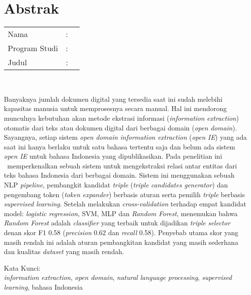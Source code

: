 %
%
%

\chapter*{Abstrak}

\vspace*{0.2cm}

\noindent \begin{tabular}{l l p{10cm}}
	Nama&: & \penulis \\
	Program Studi&: & \program \\
	Judul&: & \judul \\
\end{tabular} \\ 

\vspace*{0.5cm}

\noindent Banyaknya jumlah dokumen digital yang tersedia saat ini sudah melebihi kapasitas manusia untuk memprosesnya secara manual. Hal ini mendorong munculnya kebutuhan akan metode ekstrasi informasi (\textit{information extraction}) otomatis dari teks atau dokumen digital dari berbagai domain (\textit{open domain}). Sayangnya, setiap sistem \textit{open domain information extraction} (\textit{open IE}) yang ada saat ini hanya berlaku untuk satu bahasa tertentu saja dan belum ada sistem \textit{open IE} untuk bahasa Indonesia yang dipublikasikan. Pada penelitian ini \saya~memperkenalkan sebuah sistem untuk mengekstraksi relasi antar entitas dari teks bahasa Indonesia dari berbagai domain. Sistem ini menggunakan sebuah NLP \textit{pipeline}, pembangkit kandidat \textit{triple} (\textit{triple candidates generator}) dan pengembang token (\textit{token expander}) berbasis aturan serta pemilih \textit{triple} berbasis \textit{supervised learning}. Setelah melakukan \textit{cross-validation} terhadap empat kandidat model: \textit{logistic regression}, SVM, MLP dan \textit{Random Forest}, \saya menemukan bahwa \textit{Random Forest} adalah \textit{classifier} yang terbaik untuk dijadikan \textit{triple selector} denan skor F1 0.58 (\textit{precision} 0.62 dan \textit{recall} 0.58). Penyebab utama skor yang masih rendah ini adalah aturan pembangkitan kandidat yang masih sederhana dan kualitas \textit{dataset} yang masih rendah. \\

\vspace*{0.2cm}

\noindent Kata Kunci: \\ 
\noindent \textit{information extraction}, \textit{open domain}, \textit{natural language processing}, \textit{supervised learning}, bahasa Indonesia \\

\newpage